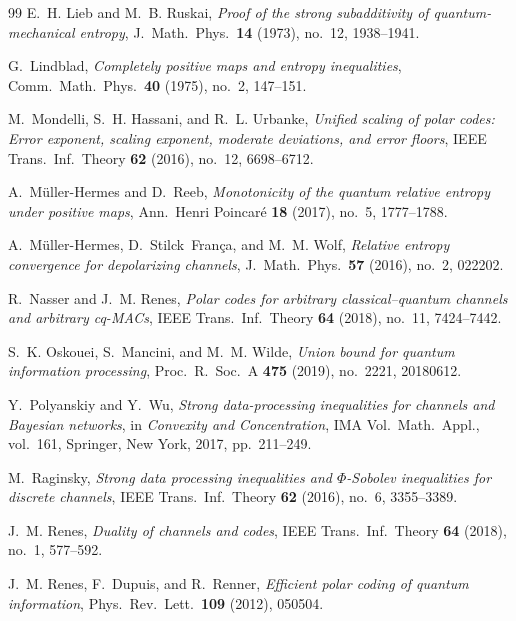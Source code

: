 \documentclass[10pt,a4paper]{article}
\numberwithin{equation}{section}
\theoremstyle{plain}
\theoremstyle{definition}
\theoremstyle{remark}
\begin{document}
\begin{thebibliography}{99}
E.~H. Lieb and M.~B. Ruskai, \emph{Proof of the strong subadditivity of quantum-mechanical entropy}, J.\ Math.\ Phys.\ \textbf{14} (1973), no.~12, 1938--1941.

G.~Lindblad, \emph{Completely positive maps and entropy inequalities}, Comm.\ Math.\ Phys.\ \textbf{40} (1975), no.~2, 147--151.

M.~Mondelli, S.~H. Hassani, and R.~L. Urbanke, \emph{Unified scaling of polar codes: Error exponent, scaling exponent, moderate deviations, and error floors}, IEEE Trans.\ Inf.\ Theory \textbf{62} (2016), no.~12, 6698--6712.

A.~M\"{u}ller-Hermes and D.~Reeb, \emph{Monotonicity of the quantum relative entropy under positive maps}, Ann.\ Henri Poincar\'{e} \textbf{18} (2017), no.~5, 1777--1788.

A.~M\"{u}ller-Hermes, D.~Stilck~Fran\c{c}a, and M.~M. Wolf, \emph{Relative entropy convergence for depolarizing channels}, J.\ Math.\ Phys.\ \textbf{57} (2016), no.~2, 022202.

R.~Nasser and J.~M. Renes, \emph{Polar codes for arbitrary classical--quantum channels and arbitrary cq-MACs}, IEEE Trans.\ Inf.\ Theory \textbf{64} (2018), no.~11, 7424--7442.

S.~K. Oskouei, S.~Mancini, and M.~M. Wilde, \emph{Union bound for quantum information processing}, Proc.\ R.\ Soc.\ A \textbf{475} (2019), no.~2221, 20180612.

Y.~Polyanskiy and Y.~Wu, \emph{Strong data-processing inequalities for channels and Bayesian networks}, in \emph{Convexity and Concentration}, IMA Vol.\ Math.\ Appl., vol.~161, Springer, New York, 2017, pp.~211--249.

M.~Raginsky, \emph{Strong data processing inequalities and $\Phi$-Sobolev inequalities for discrete channels}, IEEE Trans.\ Inf.\ Theory \textbf{62} (2016), no.~6, 3355--3389.

J.~M. Renes, \emph{Duality of channels and codes}, IEEE Trans.\ Inf.\ Theory \textbf{64} (2018), no.~1, 577--592.

J.~M. Renes, F.~Dupuis, and R.~Renner, \emph{Efficient polar coding of quantum information}, Phys.\ Rev.\ Lett.\ \textbf{109} (2012), 050504.


\end{thebibliography}
\end{document}
